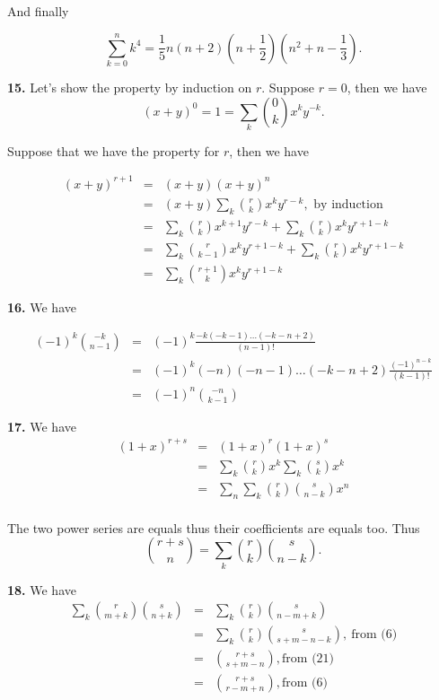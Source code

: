 \documentclass[a4paper,12pt]{article}
\newcommand{\newpar}[1]{\bigskip \noindent \textbf{#1.}}
\begin{document}
And finally

\[ \sum_{k=0}^n k^4 = \frac{1}{5}n(n+2)\left(n+\frac{1}{2}\right)
\left(n^2 + n - \frac{1}{3}\right).\]

\newpar{15} Let's show the property by induction on $r$.  Suppose
$r=0$, then we have
\[ (x+y)^0 = 1 = \sum_k {0 \choose k} x^k y^{-k}.\]

Suppose that we have the property for $r$, then we have

\begin{eqnarray*}
  (x+y)^{r+1} &=& (x + y) (x+y)^n \\
  &=& (x+y) \sum_k {r \choose k} x^k y^{r-k}, \mbox{ by induction} \\
  &=& \sum_k {r \choose k} x^{k+1} y^{r-k} + \sum_k {r \choose k} x^k y^{r+1-k} \\
  &=& \sum_k {r \choose {k-1}} x^k y^{r+1-k} + \sum_k {r \choose k} x^k y^{r+1-k} \\
  &=& \sum_k {{r+1} \choose k} x^k y^{r+1-k}
\end{eqnarray*}

\newpar{16} We have

\begin{eqnarray*}
  (-1)^k {{-k} \choose {n-1}} &=& (-1)^k \frac{-k (-k-1)\ldots
    (-k-n+2)}{(n-1)!} \\
  &=& (-1)^k (-n) (-n-1)\ldots(-k-n+2) \frac{(-1)^{n-k}}{(k-1)!} \\
  &=& (-1)^n {{-n} \choose {k-1}}
\end{eqnarray*}

\newpar{17} We have
\begin{eqnarray*}
  (1+x)^{r+s} &=& (1+x)^r (1+x)^s \\
  &=& \sum_k {r \choose k} x^k \sum_k {s \choose k} x^k \\
  &=& \sum_n \sum_k {r \choose k} {s \choose {n-k}} x^n \\
\end{eqnarray*}

The two power series are equals thus their coefficients are equals
too.  Thus
\[ {{r+s} \choose n} = \sum_k {r \choose k} {s \choose {n-k}}.\]

\newpar{18} We have
\begin{eqnarray*}
  \sum_k {r \choose {m+k}} {s \choose {n+k}} &=& \sum_k {r \choose k}
      {s \choose {n-m+k}} \\
  &=& \sum_k {r \choose k} {s \choose {s+m-n-k}},\ \mbox{from (6)} \\
  &=& {{r+s} \choose {s+m-n}}, \mbox{from (21)}\\
  &=& {{r+s} \choose {r-m+n}}, \mbox{from (6)}
\end{eqnarray*}
\end{document}
